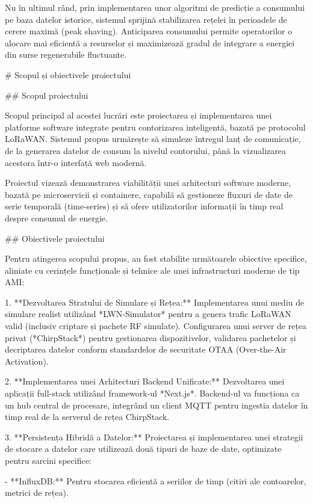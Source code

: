 Nu în ultimul rând, prin implementarea unor algoritmi de predicție a
consumului pe baza datelor istorice, sistemul sprijină stabilizarea
rețelei în perioadele de cerere maximă (peak shaving). Anticiparea
consumului permite operatorilor o alocare mai eficientă a resurselor și
maximizează gradul de integrare a energiei din surse regenerabile
fluctuante.

# Scopul și obiectivele proiectului

## Scopul proiectului

Scopul principal al acestei lucrări este proiectarea și implementarea
unei platforme software integrate pentru contorizarea inteligentă,
bazată pe protocolul LoRaWAN. Sistemul propus urmărește să simuleze
întregul lanț de comunicație, de la generarea datelor de consum la
nivelul contorului, până la vizualizarea acestora într-o interfață web
modernă.

Proiectul vizează demonstrarea viabilității unei arhitecturi software
moderne, bazată pe microservicii și containere, capabilă să gestioneze
fluxuri de date de serie temporală (time-series) și să ofere
utilizatorilor informații în timp real despre consumul de energie.

## Obiectivele proiectului

Pentru atingerea scopului propus, au fost stabilite următoarele
obiective specifice, aliniate cu cerințele funcționale și tehnice ale
unei infrastructuri moderne de tip AMI:

1.  **Dezvoltarea Stratului de Simulare și Rețea:** Implementarea unui
    mediu de simulare realist utilizând *LWN-Simulator* pentru a genera
    trafic LoRaWAN valid (inclusiv criptare și pachete RF simulate).
    Configurarea unui server de rețea privat (*ChirpStack*) pentru
    gestionarea dispozitivelor, validarea pachetelor și decriptarea
    datelor conform standardelor de securitate OTAA (Over-the-Air
    Activation).

2.  **Implementarea unei Arhitecturi Backend Unificate:** Dezvoltarea
    unei aplicații full-stack utilizând framework-ul *Next.js*.
    Backend-ul va funcționa ca un hub central de procesare, integrând un
    client MQTT pentru ingestia datelor în timp real de la serverul de
    rețea ChirpStack.

3.  **Persistența Hibridă a Datelor:** Proiectarea și implementarea unei
    strategii de stocare a datelor care utilizează două tipuri de baze
    de date, optimizate pentru sarcini specifice:

    - **InfluxDB:** Pentru stocarea eficientă a seriilor de timp (citiri
      ale contoarelor, metrici de rețea).

